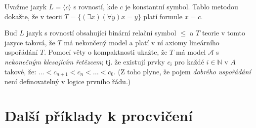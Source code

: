 \begin{problem} %

    Uvažme jazyk $L=\langle c\rangle$ s rovností, kde $c$ je konstantní symbol. Tablo metodou dokažte, že v teorii $T=\{(\exists x)(\forall y)x=y\}$ platí formule $x=c$.

    \begin{solution}
                    
    \end{solution}

\end{problem}


\begin{problem} 
    
    Buď $L$ jazyk s rovností obsahující binární relační symbol $\le$ a $T$ teorie v tomto jazyce taková, že $T$ má nekončený model a platí v ní axiomy lineárního uspořádání $T$. Pomocí věty o kompaktnosti ukažte, že $T$ má model $\mathcal{A}$ s \emph{nekonečným klesajícím řetězcem}; tj. že existují prvky $c_i$ pro každé $i\in \mathbb{N}$ v $A$ takové, že: $\dots < c_{n+1} < c_n< \dots <c_0$.
    (Z toho plyne, že pojem \emph{dobrého uspořádání} není definovatelný v logice prvního řádu.)

    \begin{solution}
                    
    \end{solution}

\end{problem}




\section*{Další příklady k procvičení}


